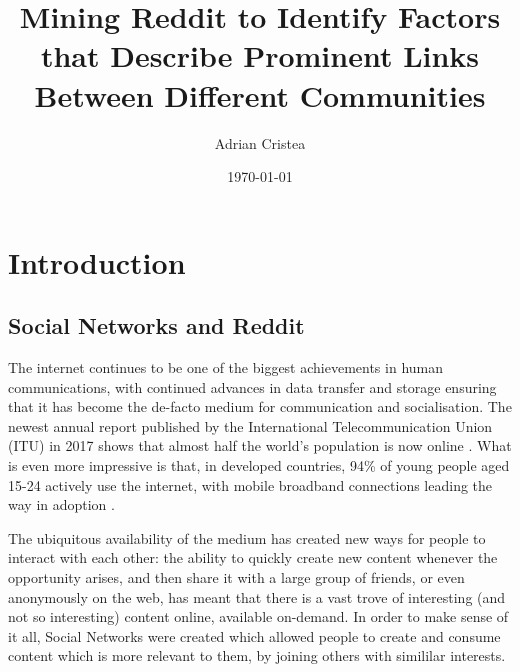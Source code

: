 \documentclass[bsc,frontabs,twoside,singlespacing,parskip,deptreport]{infthesis}
\begin{document}
\title{Mining Reddit to Identify Factors that Describe Prominent Links Between Different Communities}

\author{Adrian Cristea}



\date{\today}


\maketitle

\tableofcontents


\chapter{Introduction}

\section{Social Networks and Reddit}

The internet continues to be one of the biggest achievements in human communications, with continued advances in data transfer and storage ensuring that it has become the de-facto medium for communication and socialisation. The newest annual report published by the International Telecommunication Union (ITU) in 2017 shows that almost half the world's population is now online \cite{ICT2017}. What is even more impressive is that, in developed countries, 94\% of young people aged 15-24 actively use the internet, with mobile broadband connections leading the way in adoption \cite{ICT2017}.

The ubiquitous availability of the medium has created new ways for people to interact with each other: the ability to quickly create new content whenever the opportunity arises, and then share it with a large group of friends, or even anonymously on the web, has meant that there is a vast trove of interesting (and not so interesting) content online, available on-demand. In order to make sense of it all, Social Networks were created which allowed people to create and consume content which is more relevant to them, by joining others with simililar interests.
\end{document}
